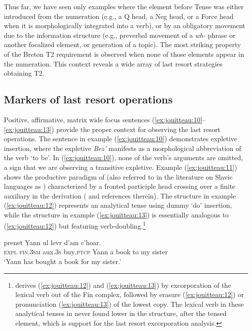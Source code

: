 \documentclass[output=paper,colorlinks,citecolor=brown]{langscibook}
\begin{document}
Thus far, we have seen only examples where the element before Tense was either introduced from the numeration (e.g., a Q head, a Neg head, or a Force head when it is morphologically integrated into a verb), or by an obligatory movement due to the information structure (e.g., preverbal movement of a \textit{wh-} phrase or another focalized element, or generation of a topic). The most striking property of the Breton T2 requirement is observed when none of those elements appear in the numeration. This context reveals a wide array of last resort strategies obtaining T2.


\subsection{Markers of last resort operations}

Positive, affirmative, matrix wide focus sentences (\ref{ex:jouitteau:10}--\ref{ex:jouitteau:13}) provide the proper context for observing the last resort operations. The sentence in example ({\ref{ex:jouitteau:10}}) demonstrates expletive insertion, where the expletive \textit{Bez’} manifests as a morphological abbreviation of the verb ‘to be’. In (\ref{ex:jouitteau:10}), none of the verb’s arguments are omitted, a sign that we are observing a transitive expletive. Example (\ref{ex:jouitteau:11}) shows the productive paradigm of  (also referred to in the literature on Slavic languages as ) characterized by a fronted participle head crossing over a finite auxiliary in the derivation (\cite{mj:BRS1996} and references therein). The structure in example (\ref{ex:jouitteau:12}) represents an analytical tense using dummy ‘do’ insertion, while the structure in example (\ref{ex:jouitteau:13}) is essentially analogous to (\ref{ex:jouitteau:12}) but featuring verb-doubling.\footnote{\citet{mj:Jouitteau2012} derives (\ref{ex:jouitteau:12}) and (\ref{ex:jouitteau:13}) by excorporation of the lexical verb out of the Fin complex, followed by erasure (\ref{ex:jouitteau:12}) or pronunciation (\ref{ex:jouitteau:13}) of the lowest copy. The lexical verb in these analytical tenses in never found lower in the structure, after the tensed element, which is support for the last resort excorporation analysis.}

\ea \label{ex:jouitteau:10}
    \gll {}  {}            {}      prenet    Yann    ul levr  d'am   c’hoar.\\
       \textsc{expl}  \textsc{fin.3sm} aux\textsc{.3s} buy\textsc{.ptcp} Yann   a  book  {to my} sister   \\
    \glt `Yann has bought a book for my sister.'
\z 
\end{document}
